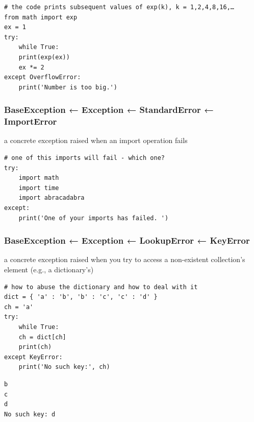 \documentclass[11pt]{article}
\begin{document}
\begin{verbatim}
# the code prints subsequent values of exp(k), k = 1,2,4,8,16,…
from math import exp
ex = 1
try:
    while True:
	print(exp(ex))
	ex *= 2
except OverflowError:
    print('Number is too big.')

\end{verbatim}

\subsubsection{BaseException ← Exception ← StandardError ← ImportError}
\label{sec:orga0036e8}
a concrete exception raised when an import operation fails

\begin{verbatim}
# one of this imports will fail - which one?
try:
    import math
    import time
    import abracadabra
except:
    print('One of your imports has failed. ')
\end{verbatim}

\subsubsection{BaseException ← Exception ← LookupError ← KeyError}
\label{sec:org9c849f3}
a concrete exception raised when you try to access a non-existent
collection’s element (e.g., a dictionary’s)

\begin{verbatim}
# how to abuse the dictionary and how to deal with it
dict = { 'a' : 'b', 'b' : 'c', 'c' : 'd' }
ch = 'a'
try:
    while True:
	ch = dict[ch]
	print(ch)
except KeyError:
    print('No such key:', ch)

\end{verbatim}

\begin{verbatim}
b
c
d
No such key: d
\end{verbatim}
\end{document}
